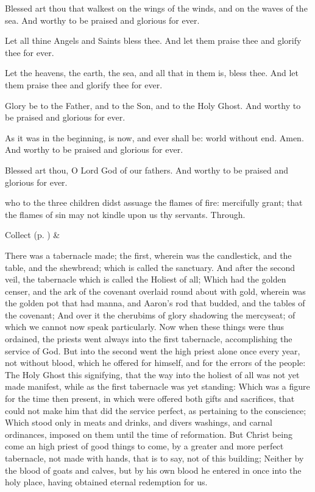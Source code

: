 Blessed art thou that walkest on the wings of the winds, and on the waves of the sea. And worthy to be praised and glorious for ever.

Let all thine Angels and Saints bless thee. And let them praise thee and glorify thee for ever.

Let the heavens, the earth, the sea, and all that in them is, bless thee. And let them praise thee and glorify thee for ever.

Glory be to the Father, and to the Son, and to the Holy Ghost. And worthy to be praised and glorious for ever.

As it was in the beginning, is now, and ever shall be: world without end. Amen. And worthy to be praised and glorious for ever.

Blessed art thou, O Lord God of our fathers. And worthy to be praised and glorious for ever.\\


\collect
{} who to the three children didst assuage the flames of fire: mercifully grant; that the flames of sin may not kindle upon us thy servants. Through.
\begin{rubric}
     Collect  (p. \pageref{SPSaints}) \&  
\end{rubric}

 There was a tabernacle made; the first, wherein was the candlestick, and the table, and the shewbread; which is called the sanctuary. And after the second veil, the tabernacle which is called the Holiest of all; Which had the golden censer, and the ark of the covenant overlaid round about with gold, wherein was the golden pot that had manna, and Aaron's rod that budded, and the tables of the covenant; And over it the cherubims of glory shadowing the mercyseat; of which we cannot now speak particularly. Now when these things were thus ordained, the priests went always into the first tabernacle, accomplishing the service of God. But into the second went the high priest alone once every year, not without blood, which he offered for himself, and for the errors of the people: The Holy Ghost this signifying, that the way into the holiest of all was not yet made manifest, while as the first tabernacle was yet standing: Which was a figure for the time then present, in which were offered both gifts and sacrifices, that could not make him that did the service perfect, as pertaining to the conscience; Which stood only in meats and drinks, and divers washings, and carnal ordinances, imposed on them until the time of reformation. But Christ being come an high priest of good things to come, by a greater and more perfect tabernacle, not made with hands, that is to say, not of this building; Neither by the blood of goats and calves, but by his own blood he entered in once into the holy place, having obtained eternal redemption for us.

